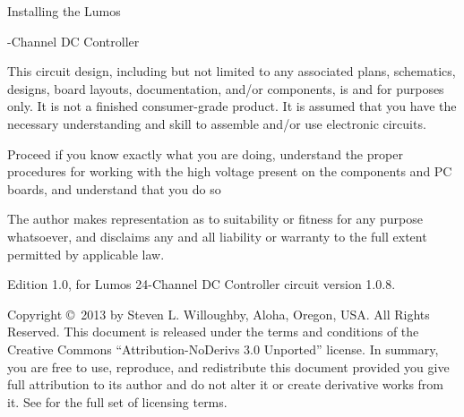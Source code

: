 \documentclass[letterpaper,twoside,onecolumn,openright,final]{memoir}
\begin{document}
\frontmatter

\thispagestyle{empty}
\vfill
\begin{center}
{\HUGE Installing the Lumos\TM}

\bigskip

{-Channel DC Controller}

\vfill

\end{center}

\newpage
\begin{center}


\end{center}

This circuit design, including but not limited to any associated plans, schematics, designs, board layouts, documentation, 
and/or components, is  and for  purposes only. It is not a finished consumer-grade product.
It is assumed that you have the necessary understanding and skill to assemble and/or use electronic circuits.

Proceed  if you know exactly what you are doing, understand the proper procedures for working with the high voltage present on the components and PC boards, and understand that you do so 

The author makes  representation as to suitability or fitness for any purpose whatsoever, and disclaims any and all liability or warranty to the full extent permitted by applicable law.

\strut\vfill
\noindent Edition 1.0, for Lumos 24-Channel DC Controller circuit version 1.0.8.

\smallskip


\noindent Copyright \copyright\ 2013 by Steven L. Willoughby,
Aloha, Oregon, USA.  All Rights Reserved.  
This document is released under the terms and conditions of the 
Creative Commons ``Attribution-NoDerivs 3.0 Unported'' license.  
In summary, you are free to use, reproduce, and redistribute this 
document provided you give full attribution to its author and do not
alter it or create derivative works from it.  See
 for the full
set of licensing terms.

\begin{center}
\end{center}
\end{document}
